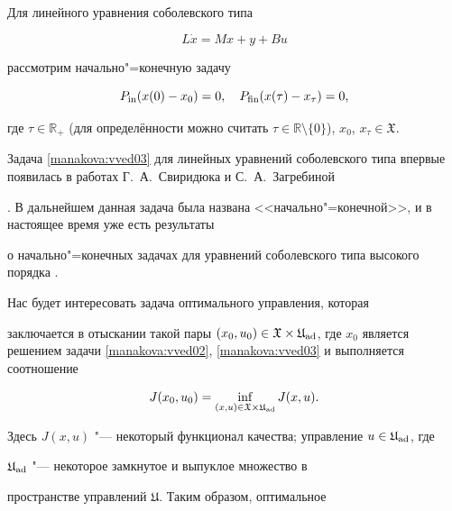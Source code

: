 \smallskip



Для линейного уравнения соболевского типа

\begin{equation}\label{manakova:vved02}

L\dot x = Mx + y + Bu

\end{equation}

рассмотрим начально"=конечную задачу

\begin{equation}\label{manakova:vved03}

P_{\rm in} (x(0) - x_0)=0,\quad P_{\rm fin} (x(\tau) - x_\tau)=0,

\end{equation}

где $\tau\in {\mathbb R}_+$ (для определённости можно считать $\tau\in\mathbb R\setminus\{0\}$), $x_0$, $x_\tau\in\mathfrak{X}$.



Задача \eqref{manakova:vved03} для линейных уравнений соболевского типа впервые появилась в работах Г.~А.~Свиридюка и С.~А.~Загребиной

\cite{manakova:bib:svzag}. В дальнейшем данная задача была названа <<начально"=конечной>>, и в настоящее время уже есть результаты

о начально"=конечных задачах для уравнений соболевского типа высокого порядка \cite{manakova:bib:zam}.



Нас будет интересовать задача оптимального управления, которая

заключается в отыскании такой пары $(x_0, u_0) \in \mathfrak X\times\mathfrak U_{\rm ad}$, где $x_0$ является решением задачи \eqref{manakova:vved02}, \eqref{manakova:vved03} и выполняется соотношение

\begin{equation}\label{manakova:vved04}

J(x_0, u_0)= \inf_{(x, u) \in \mathfrak X

\times\mathfrak U_{\rm ad}} J(x, u).

\end{equation}

Здесь $J(x, u)$ "--- некоторый функционал качества; управление $u \in {\mathfrak U}_{\rm ad}$, где

${\mathfrak U}_{\rm ad}$ "--- некоторое замкнутое и выпуклое множество в

пространстве управлений ${\mathfrak U}$. Таким образом, оптимальное

